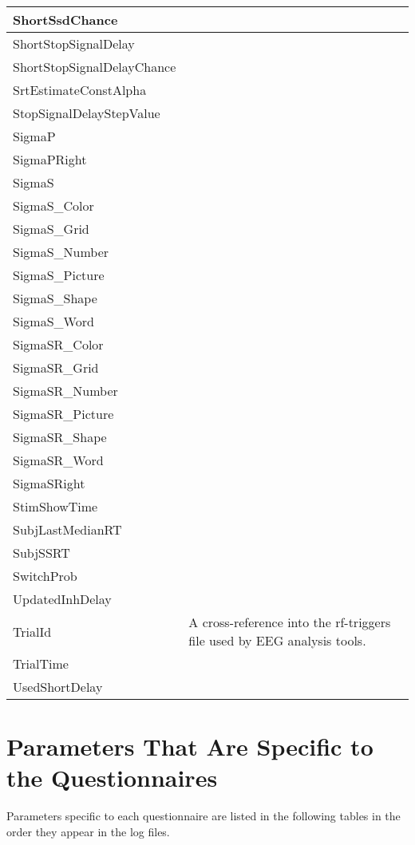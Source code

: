 \documentclass[letterpaper,10pt,english]{sphinxmanual}
\begin{document}
\begin{savenotes}
\begin{longtable}{|l|l|}
\\
\hline
ShortSsdChance
&\\
\hline
ShortStopSignalDelay
&\\
\hline
ShortStopSignalDelayChance
&\\
\hline
SrtEstimateConstAlpha
&\\
\hline
StopSignalDelayStepValue
&\\
\hline
SigmaP
&\\
\hline
SigmaPRight
&\\
\hline
SigmaS
&\\
\hline
SigmaS\_Color
&\\
\hline
SigmaS\_Grid
&\\
\hline
SigmaS\_Number
&\\
\hline
SigmaS\_Picture
&\\
\hline
SigmaS\_Shape
&\\
\hline
SigmaS\_Word
&\\
\hline
SigmaSR\_Color
&\\
\hline
SigmaSR\_Grid
&\\
\hline
SigmaSR\_Number
&\\
\hline
SigmaSR\_Picture
&\\
\hline
SigmaSR\_Shape
&\\
\hline
SigmaSR\_Word
&\\
\hline
SigmaSRight
&\\
\hline
StimShowTime
&\\
\hline
SubjLastMedianRT
&\\
\hline
SubjSSRT
&\\
\hline
SwitchProb
&\\
\hline
UpdatedInhDelay
&\\
\hline
TrialId
&
A cross-reference into the rf-triggers file used by EEG analysis tools.
\\
\hline
TrialTime
&\\
\hline
UsedShortDelay
&\\
\hline
\end{longtable}\sphinxatlongtableend\end{savenotes}


\section{Parameters That Are S­pecific to the Questionnaires}
\label{\detokenize{Data_Definations_Phase1B:parameters-that-are-specific-to-the-questionnaires}}
Parameters specific to each questionnaire are listed in the following
tables in the order they appear in the log files.
\end{document}

